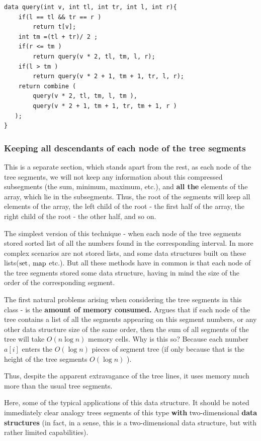 \begin{verbatim}
data query(int v, int tl, int tr, int l, int r){
    if(l == tl && tr == r )
        return t[v];
    int tm =(tl + tr)/ 2 ;
    if(r <= tm )
        return query(v * 2, tl, tm, l, r);
    if(l > tm )
        return query(v * 2 + 1, tm + 1, tr, l, r);
    return combine (
        query(v * 2, tl, tm, l, tm ),
        query(v * 2 + 1, tm + 1, tr, tm + 1, r )
   );
} 
\end{verbatim}
\subsubsection{ Keeping all descendants of each node of the tree segments }

This is a separate section, which stands apart from the rest, as each node of the tree segments, we will not keep any information about this compressed subsegments (the sum, minimum, maximum, etc.), and \textbf{all the} elements of the array, which lie in the subsegments. Thus, the root of the segments will keep all elements of the array, the left child of the root - the first half of the array, the right child of the root - the other half, and so on.

The simplest version of this technique - when each node of the tree segments stored sorted list of all the numbers found in the corresponding interval. In more complex scenarios are not stored lists, and some data structures built on these lists($\rm set$, $\rm map$ etc.). But all these methods have in common is that each node of the tree segments stored some data structure, having in mind the size of the order of the corresponding segment.

The first natural problems arising when considering the tree segments in this class - is the \textbf{amount of memory consumed.} Argues that if each node of the tree contains a list of all the segments appearing on this segment numbers, or any other data structure size of the same order, then the sum of all segments of the tree will take $O (n \log n)$ memory cells. Why is this so? Because each number $a [i]$ enters the $O (\log n)$ pieces of segment tree (if only because that is the height of the tree segments $O (\log n)$ ).

Thus, despite the apparent extravagance of the tree lines, it uses memory much more than the usual tree segments.

Here, some of the typical applications of this data structure. It should be noted immediately clear analogy trees segments of this type \textbf{with} two-dimensional \textbf{data structures} (in fact, in a sense, this is a two-dimensional data structure, but with rather limited capabilities).

